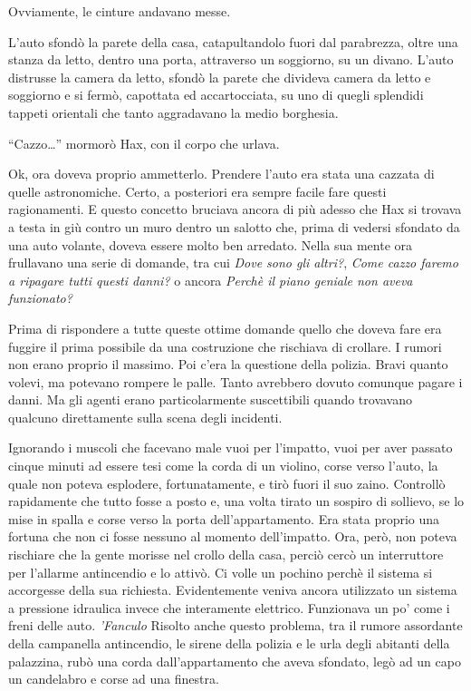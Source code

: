     Ovviamente, le cinture andavano messe.

    L'auto sfondò la parete della casa, catapultandolo fuori dal
    parabrezza, oltre una stanza da letto, dentro una porta, attraverso un
    soggiorno, su un divano. L'auto distrusse la camera da letto, sfondò la
    parete che divideva camera da letto e soggiorno e si fermò, capottata
    ed accartocciata, su uno di quegli splendidi tappeti orientali che
    tanto aggradavano la medio borghesia.

    ``Cazzo\dots{}'' mormorò Hax, con il corpo che urlava.

    Ok, ora doveva proprio ammetterlo. Prendere l'auto era stata una
    cazzata di quelle astronomiche. Certo, a posteriori era sempre facile
    fare questi ragionamenti. E questo concetto bruciava ancora di più
    adesso che Hax si trovava a testa in giù contro un muro dentro un
    salotto che, prima di vedersi sfondato da una auto volante, doveva
    essere molto ben arredato. Nella sua mente ora frullavano una serie di
    domande, tra cui \emph{Dove sono gli altri?}, \emph{Come cazzo faremo
    a ripagare tutti questi danni?} o ancora \emph{Perchè il piano geniale
    non aveva funzionato?}
    
    Prima di rispondere a tutte queste ottime domande quello che doveva
    fare era fuggire il prima possibile da una costruzione che rischiava di
    crollare. I rumori non erano proprio il massimo. Poi c'era la questione
    della polizia. Bravi quanto volevi, ma potevano rompere le palle. Tanto
    avrebbero dovuto comunque pagare i danni. Ma gli agenti erano
    particolarmente suscettibili quando trovavano qualcuno direttamente
    sulla scena degli incidenti.

    Ignorando i muscoli che facevano male vuoi per l'impatto, vuoi per aver
    passato cinque minuti ad essere tesi come la corda di un violino, corse
    verso l'auto, la quale non poteva esplodere, fortunatamente, e tirò
    fuori il suo zaino. Controllò rapidamente che tutto fosse a posto e,
    una volta tirato un sospiro di sollievo, se lo mise in spalla e corse
    verso la porta dell'appartamento. Era stata proprio una fortuna che non
    ci fosse nessuno al momento dell'impatto. Ora, però, non poteva
    rischiare che la gente morisse nel crollo della casa, perciò cercò un
    interruttore per l'allarme antincendio e lo attivò. Ci volle un pochino
    perchè il sistema si accorgesse della sua richiesta. Evidentemente veniva
    ancora utilizzato un sistema a pressione idraulica invece che
    interamente elettrico. Funzionava un po' come i freni delle auto.
    \emph{'Fanculo} Risolto anche questo problema, tra il rumore assordante
    della campanella antincendio, le sirene della polizia e le urla degli
    abitanti della palazzina,
    rubò una corda dall'appartamento che aveva sfondato, legò ad un capo un
    candelabro e corse ad una finestra.

